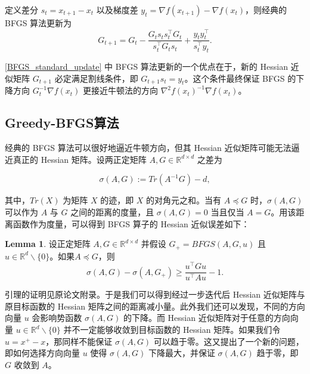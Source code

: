 \documentclass[a4paper,twoside,AutoFakeBold]{article}
\theoremstyle{definition}
\newtheorem{lema2}{{Lemma}}
\begin{document}
定义差分 $s_t = x_{t+1}-x_t$ 以及梯度差 $y_t = \nabla f(x_{t+1})-\nabla f(x_t)$，则经典的 BFGS 算法更新为
\begin{equation}\label{BFGS_standard_update}
    G_{t+1} = G_t - \frac{G_t s_t s_t^\top G_t}{s_t^\top G_t s_t} + \frac{y_t y_t^\top}{s_t^\top y_t}.
\end{equation}

\eqref{BFGS_standard_update} 中 BFGS 算法更新的一个优点在于，新的 Hessian 近似矩阵 $G_{t+1}$ 必定满足割线条件，即 $G_{t+1}s_t = y_t$。这个条件最终保证 BFGS 的下降方向 $G_t^{-1}\nabla f(x_t)$ 更接近牛顿法的方向 $\nabla^2 f(x_t)^{-1}\nabla f(x_t)$。

\subsection{Greedy-BFGS算法}\label{section:greedy_BFGS}

经典的 BFGS 算法可以很好地逼近牛顿方向，但其 Hessian 近似矩阵可能无法逼近真正的 Hessian 矩阵。设两正定矩阵 $A,G\in \mathbb{R}^{d \times d}$ 之差为

\begin{equation}\label{sigma}
    \sigma(A, G) := Tr(A^{-1}G) - d,
\end{equation}

其中，$Tr(X)$ 为矩阵 $X$ 的迹，即 $X$ 的对角元之和。当有 $A \preceq G$ 时，$\sigma(A, G)$ 可以作为 $A$ 与 $G$ 之间的距离的度量，且 $\sigma(A, G) = 0$ 当且仅当 $A = G$。用该距离函数作为度量，可以得到 BFGS 算子的 Hessian 近似误差如下：

\begin{lema2}\label{lema2_BFGS_general}
    设正定矩阵 $A, G \in \mathbb{R}^{d \times d}$ 并假设 $G_{+} = BFGS(A, G, u)$ 且 $u \in \mathbb{R}^d\backslash\{0\}$。如果$A \preceq G$，则
    \begin{equation}\label{lema2_BFGS_general_1}
        \sigma(A, G) - \sigma(A, G_+) \geq \frac{u^\top G u}{u^\top A u}-1.
    \end{equation}
\end{lema2}

引理的证明见原论文附录。于是我们可以得到经过一步迭代后 Hessian 近似矩阵与原目标函数的 Hessian 矩阵之间的距离减小量。此外我们还可以发现，不同的方向向量 $u$ 会影响势函数 $\sigma(A, G)$ 的下降。而 Hessian 近似矩阵对于任意的方向向量 $u \in \mathbb{R}^{d}\backslash\{0\}$ 并不一定能够收敛到目标函数的 Hessian 矩阵。如果我们令 $u=x^+-x$，那同样不能保证 $\sigma(A, G)$ 可以趋于零。这又提出了一个新的问题，即如何选择方向向量 $u$ 使得 $\sigma(A, G)$ 下降最大，并保证 $\sigma(A, G)$ 趋于零，即 $G$ 收敛到 $A$。
\end{document}
